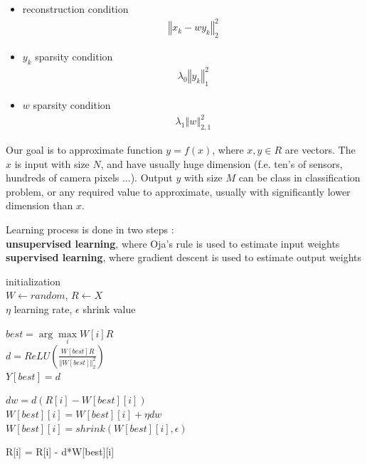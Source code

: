 \documentclass[10pt,a4paper]{article}
\begin{document}
\begin{itemize}
  \item
      reconstruction condition
      \color{red}
      \begin{align*}
      \left\Vert x_k - wy_k \right\Vert^2_2
      \end{align*}
      \color{black}


  \item
      $y_k$ sparsity condition
      \color{green}
      \begin{align*}
      \lambda_0 \left\Vert y_k \right\Vert^2_1
      \end{align*}
      \color{black}


  \item
      $w$ sparsity condition
      \color{blue}
      \begin{align*}
      \lambda_1 \left\Vert w \right\Vert^2_{2,1}
      \end{align*}
      \color{black}
\end{itemize}


Our goal is to approximate function $y = f(x)$, where $x,y \in \!R$ are vectors.
The $x$ is input with size $N$, and have usually huge dimension (f.e. ten's of sensors, hundreds of camera pixels ...).
Output $y$ with size $M$ can be class in classification problem, or any required value to approximate, usually with
significantly lower dimension than $x$.

Learning process is done in two steps : \\
{\bf unsupervised learning}, where Oja's rule is used to estimate input weights \\
{\bf supervised learning}, where gradient descent is used to estimate output weights \\

\begin{algorithm}
 initialization  \\
                $W \gets random$, $R \gets X$ \\
                $\eta$ learning rate, $\epsilon$ shrink value \\
 {
  \color{blue}
  $best = \arg\max\limits_{i} W[i] R $ \\
  \color{red}
  $d = ReLU (\frac{W[best] R}{\Vert W[best]\Vert^2_2})$ \\
  $Y[best] = d$ \\
  \color{black}
  {
    $dw = d(R[i] - W[best][i])$ \\
    $W[best][i] = W[best][i] + \eta dw$ \\

    $W[best][i] = shrink(W[best][i], \epsilon)$

    \color{green}
    R[i] = R[i] - d*W[best][i]
  }
 }
\end{algorithm}
\end{document}
